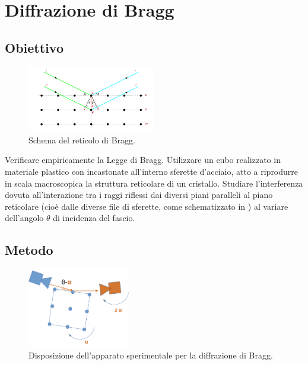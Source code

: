 \documentclass[a4paper]{article}
\begin{document}
\section{Diffrazione di Bragg}
\subsection{Obiettivo}
\begin{figure}[htbp]
	\centering
	\includegraphics[width=0.5\textwidth]{grafici/schema_bragg.png}
	\caption{Schema del reticolo di Bragg.}
	\label{fig:schema_bragg}
\end{figure}

Verificare empiricamente la Legge di Bragg. Utilizzare un cubo realizzato in materiale plastico con incastonate all'interno sferette d'acciaio, atto a riprodurre in scala macroscopica la struttura reticolare di un cristallo. Studiare l'interferenza dovuta all'interazione tra i raggi riflessi dai diversi piani paralleli al piano reticolare (cioè dalle diverse file di sferette, come schematizzato in ) al variare dell'angolo $\theta$ di incidenza del fascio.

\subsection{Metodo}
\begin{figure}[htbp]
	\centering
	\includegraphics[width=0.4\textwidth]{grafici/disposizione_bragg.png}
	\caption{Disposizione dell'apparato sperimentale per la diffrazione di Bragg.}
	\label{fig:disposizione_bragg}
\end{figure}
\end{document}
